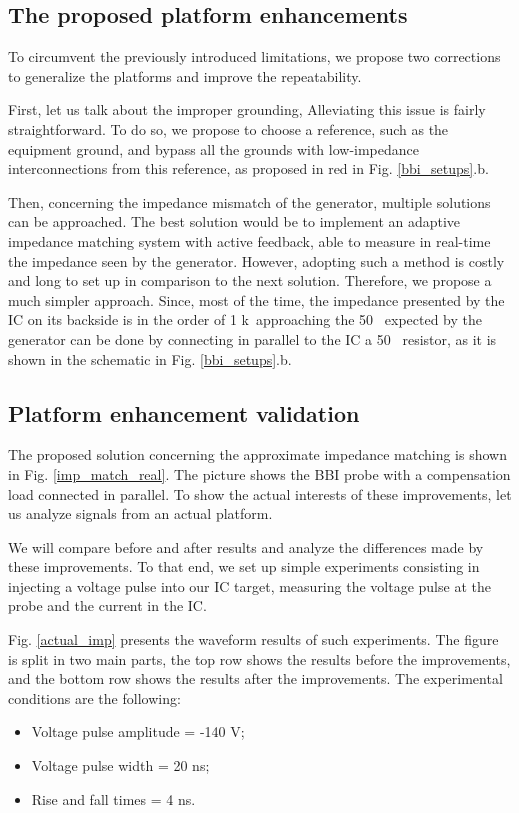 	\subsection{The proposed platform enhancements}
		To circumvent the previously introduced limitations, we propose two corrections to generalize the platforms and improve the repeatability.

		First, let us talk about the improper grounding,
		Alleviating this issue is fairly straightforward.
		To do so, we propose to choose a reference, such as the equipment ground, and bypass all the grounds with low-impedance interconnections from this reference, as proposed in red in Fig. \ref{bbi_setups}.b.

		Then, concerning the impedance mismatch of the generator, multiple solutions can be approached.
		The best solution would be to implement an adaptive impedance matching system with active feedback, able to measure in real-time the impedance seen by the generator.
		However, adopting such a method is costly and long to set up in comparison to the next solution.
		Therefore, we propose a much simpler approach.
		Since, most of the time, the impedance presented by the IC on its backside is in the order of 1 k\textOmega\, approaching the 50 \textOmega\ expected by the generator can be done by connecting in parallel to the IC a 50 \textOmega\ resistor, as it is shown in the schematic in Fig. \ref{bbi_setups}.b.

	\subsection{Platform enhancement validation}
		
		The proposed solution concerning the approximate impedance matching is shown in Fig. \ref{imp_match_real}.
		The picture shows the BBI probe with a compensation load connected in parallel.
		To show the actual interests of these improvements, let us analyze signals from an actual platform.

		We will compare before and after results and analyze the differences made by these improvements.
		To that end, we set up simple experiments consisting in injecting a voltage pulse into our IC target, measuring the voltage pulse at the probe and the current in the IC.
		
		Fig. \ref{actual_imp} presents the waveform results of such experiments.
		The figure is split in two main parts, the top row shows the results before the improvements, and the bottom row shows the results after the improvements.
		The experimental conditions are the following:
		\begin{itemize}
			\item Voltage pulse amplitude = -140 V;
			\item Voltage pulse width = 20 ns;
			\item Rise and fall times = 4 ns.
		\end{itemize}

